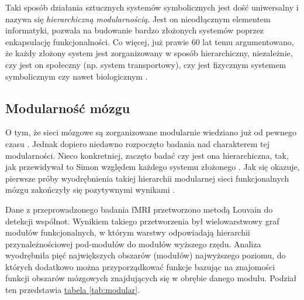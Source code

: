 Taki sposób działania sztucznych systemów symbolicznych jest dość uniwersalny i nazywa się \emph{hierarchiczną modularnością}.
Jest on nieodłącznym elementem informatyki, pozwala na budowanie bardzo złożonych systemów poprzez enkapsulację funkcjonalności.
Co więcej, już prawie 60 lat temu argumentowano, że każdy złożony system jest zorganizowany w sposób hierarchiczny, niezależnie, czy jest on społeczny (np. system transportowy), czy jest fizycznym systemem symbolicznym czy nawet biologicznym \cite{simon1962architecture}.

\subsection{Modularność mózgu}

O tym, że sieci mózgowe są zorganizowane modularnie wiedziano już od pewnego czasu \cite{bullmore2009complex}.
Jednak dopiero niedawno rozpoczęto badania nad charakterem tej modularności.
Nieco konkretniej, zaczęto badać czy jest ona hierarchiczna, tak, jak przewidywał to Simon względem każdego systemu złożonego \cite{simon1962architecture}.
Jak się okazuje, pierwsze próby wyodrębnienia takiej hierarchii modularnej sieci funkcjonalnych mózgu zakończyły się pozytywnymi wynikami \cite{meunier2009hierarchical}.

Dane z przeprowadzonego badania fMRI przetworzono metodą Louvain do detekcji wspólnot.
Wynikiem takiego przetworzenia był wielowarstwowy graf modułów funkcjonalnych, w którym warstwy odpowiadają hierarchii przynależnościowej pod-modułów do modułów wyższego rzędu.
Analiza wyodrębniła pięć największych obszarów (modułów) najwyższego poziomu, do których dodatkowo można przyporządkować funkcje bazując na znajomości funkcji obszarów mózgowych znajdujących się w obrębie danego modułu.
Podział ten przedstawia \hyperref[tab:modular]{tabela \ref*{tab:modular}}.

